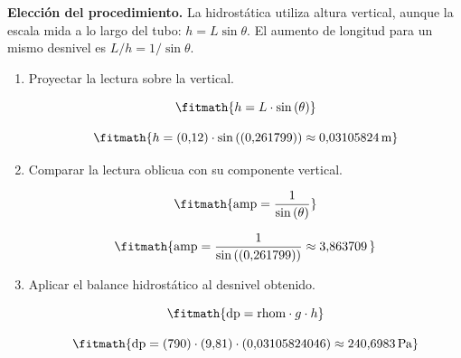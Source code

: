 \noindent\textbf{Elección del procedimiento.} La hidrostática utiliza altura vertical, aunque la escala mida a lo largo del tubo: $h=L\sin\theta$. El aumento de longitud para un mismo desnivel es $L/h=1/\sin\theta$.

\begin{enumerate}

\item Proyectar la lectura sobre la vertical.

\[\fitmath{h=L\cdot \sin\left(\theta\right)}\]

\[\fitmath{h=(0{,}12)\cdot \sin\left((0{,}261799)\right)\approx 0{,}03105824\,\mathrm{m}}\]

\item Comparar la lectura oblicua con su componente vertical.

\[\fitmath{\mathrm{amp}=\frac{1}{\sin\left(\theta\right)}}\]

\[\fitmath{\mathrm{amp}=\frac{1}{\sin\left((0{,}261799)\right)}\approx 3{,}863709\,}\]

\item Aplicar el balance hidrostático al desnivel obtenido.

\[\fitmath{\mathrm{dp}=\mathrm{rhom}\cdot g\cdot h}\]

\[\fitmath{\mathrm{dp}=(790)\cdot (9{,}81)\cdot (0{,}03105824046)\approx 240{,}6983\,\mathrm{Pa}}\]

\end{enumerate}
